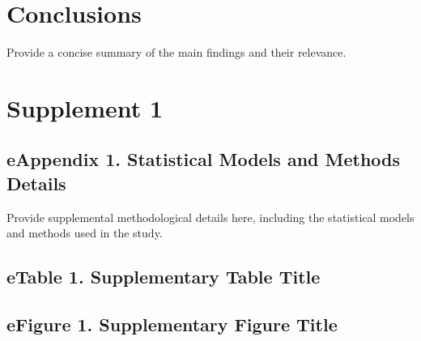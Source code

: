 \documentclass[10pt, letterpaper]{article}
\begin{document}
\section*{Conclusions}

Provide a concise summary of the main findings and their relevance.


\vspace{6pt}
\noindent{\color{jamalightgray}\rule{\textwidth}{0.4pt}}
\vspace{4pt}






{\fontsize{8.5}{10.5}\selectfont


}


\clearpage
\section*{Supplement 1}

\subsection*{eAppendix 1. Statistical Models and Methods Details}
Provide supplemental methodological details here, including the statistical models and methods used in the study.

\subsection*{eTable 1. Supplementary Table Title}

\subsection*{eFigure 1. Supplementary Figure Title}
\end{document}
